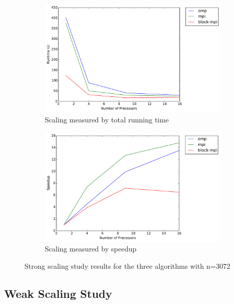 \documentclass[11pt]{article}
\begin{document}
\begin{figure}[ht]
	\centering
	\begin{subfigure}[b]{.45\textwidth}
		\includegraphics[width=\textwidth]{strong-scaling-time.pdf}
		\caption{Scaling measured by total running time}
		\label{fig:strong-scaling-time}
	\end{subfigure}
	\begin{subfigure}[b]{.45\textwidth}
		\includegraphics[width=\textwidth]{strong-scaling-speedup.pdf}
		\caption{Scaling measured by speedup}
		\label{fig:strong-scaling-speedup}
	\end{subfigure}
	\caption{Strong scaling study results for the three algorithms with n=3072}
	\label{fig:strong-scaling}
\end{figure}

\subsection{Weak Scaling Study}
\end{document}
